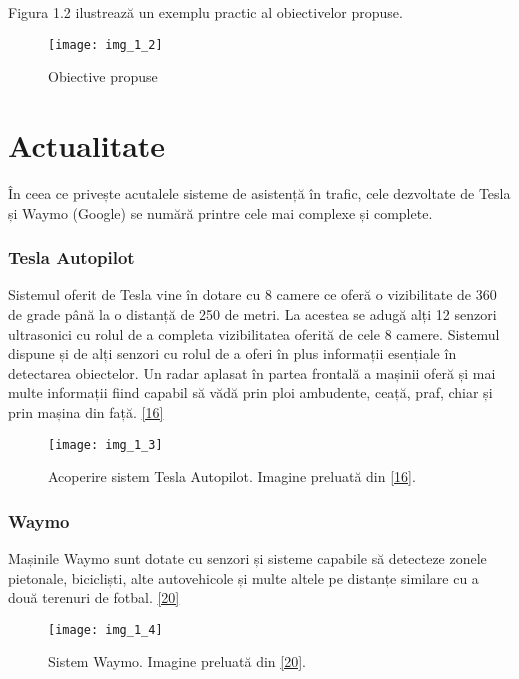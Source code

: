 Figura 1.2 ilustrează un exemplu practic al obiectivelor propuse.
\begin{figure}[!h]
	\centering
	\texttt{[image: img\_1\_2]}
	\caption{Obiective propuse}
\end{figure} 

\section{Actualitate}

În ceea ce privește acutalele sisteme de asistență în trafic, cele dezvoltate de Tesla și Waymo (Google) se numără printre cele mai complexe și complete.

\subsubsection{Tesla Autopilot}

Sistemul oferit de Tesla vine în dotare cu 8 camere ce oferă o vizibilitate de 360 de grade până la o distanță de 250 de metri. La acestea se adugă alți 12 senzori ultrasonici cu rolul de a completa vizibilitatea oferită de cele 8 camere. Sistemul dispune și de alți senzori cu rolul de a oferi în plus informații esențiale în detectarea obiectelor. Un radar aplasat în partea frontală a mașinii oferă și mai multe informații fiind capabil să vădă prin ploi ambudente, ceață, praf, chiar și prin mașina din față. \hyperlink{TeslaAutopilotSystem}{[16]}

\begin{figure}[!h]
	\centering
	\texttt{[image: img\_1\_3]}
	\caption[Acoperire sistem Tesla Autopilot]{Acoperire sistem Tesla Autopilot. Imagine preluată din \hyperlink{TeslaAutopilotSystem}{[16]}.}
\end{figure} 

\subsubsection{Waymo}

Mașinile Waymo sunt dotate cu senzori și sisteme capabile să detecteze zonele pietonale, bicicliști, alte autovehicole și multe altele pe distanțe similare cu a două terenuri de fotbal. \hyperlink{WaymoSystem}{[20]}

\begin{figure}[!h]
	\centering
	\texttt{[image: img\_1\_4]}
	\caption[Sistem Waymo]{Sistem Waymo. Imagine preluată din \hyperlink{WaymoSystem}{[20]}.}
\end{figure} 

